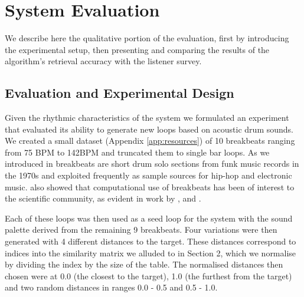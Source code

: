 
\section{System Evaluation}

We describe here the qualitative portion of the evaluation, first by introducing the experimental setup, then presenting and comparing the results of the algorithm’s retrieval accuracy with the listener survey.

\subsection{Evaluation and Experimental Design}
\label{sec:break_evaluation}

Given the rhythmic characteristics of the system we formulated an experiment that evaluated its ability to generate new loops based on acoustic drum sounds. We created a small dataset (Appendix \ref{app:resources}) of 10 breakbeats ranging from 75 BPM to 142BPM and truncated them to single bar loops. As we introduced in  breakbeats are short drum solo sections from funk music records in the 1970s and exploited frequently as sample sources for hip-hop and electronic music.  also showed that computational use of breakbeats has been of interest to the scientific community, as evident in work by \cite{Ravelli2007}, \cite{Hockman2015} and \cite{Collins2006}.

Each of these loops was then used as a seed loop for the system with the sound palette derived from the remaining 9 breakbeats. Four variations were then generated with 4 different distances to the target.  These distances correspond to indices into the similarity matrix we alluded to in Section 2, which we normalise by dividing the index by the size of the table. The normalised distances then chosen were at 0.0 (the closest to the target), 1.0 (the furthest from the target) and two random distances in ranges 0.0 - 0.5 and 0.5 - 1.0.


